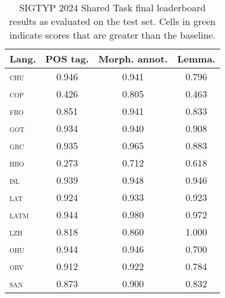 \documentclass{../acl_latex.tex}
\begin{document}
\begin{table}[t]
    \centering
    \begin{tabular}{lccc}
        \toprule
        Lang.         & POS tag.                  & Morph. annot.             & Lemma.                    \\ \midrule
        \textsc{chu}  & \cellcolor{green!25}0.946 & \cellcolor{green!25}0.941 & 0.796                     \\
        \textsc{cop}  & 0.426                     & 0.805                     & 0.463                     \\
        \textsc{fro}  & 0.851                     & \cellcolor{green!25}0.941 & 0.833                     \\
        \textsc{got}  & \cellcolor{green!25}0.934 & \cellcolor{green!25}0.940 & 0.908                     \\
        \textsc{grc}  & \cellcolor{green!25}0.935 & \cellcolor{green!25}0.965 & 0.883                     \\
        \textsc{hbo}  & 0.273                     & 0.712                     & 0.618                     \\
        \textsc{isl}  & \cellcolor{green!25}0.939 & \cellcolor{green!25}0.948 & \cellcolor{green!25}0.946 \\
        \textsc{lat}  & \cellcolor{green!25}0.924 & \cellcolor{green!25}0.933 & \cellcolor{green!25}0.923 \\
        \textsc{latm} & 0.944                     & \cellcolor{green!25}0.980 & \cellcolor{green!25}0.972 \\
        \textsc{lzh}  & 0.818                     & \cellcolor{green!25}0.860 & \cellcolor{green!25}1.000 \\
        \textsc{ohu}  & \cellcolor{green!25}0.944 & \cellcolor{green!25}0.946 & 0.700                     \\
        \textsc{orv}  & \cellcolor{green!25}0.912 & \cellcolor{green!25}0.922 & 0.784                     \\
        \textsc{san}  & 0.873                     & \cellcolor{green!25}0.900 & 0.832                     \\ \bottomrule
    \end{tabular}
    \caption{
        SIGTYP 2024 Shared Task final leaderboard results as evaluated on the test set.
        Cells in green indicate scores that are greater than the baseline.
    }
    \label{table:main_results}
\end{table}
\end{document}
